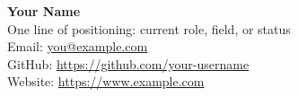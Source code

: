 \documentclass[letterpaper,10pt]{extarticle}
\newlength{\cvEntryGap}   \setlength{\cvEntryGap}{8pt}    %
\begin{document}
\pagestyle{fancy}
\renewcommand{\headrulewidth}{0pt}
\fancyhead{}
\fancyhead[R]{\textit{\monthyeardate\today}}
\thispagestyle{empty}

\begin{flushleft}
\textbf{\LARGE Your Name}\\[\cvEntryGap] %
One line of positioning: current role, field, or status
\\ Email: \url{you@example.com}
\\ GitHub: \url{https://github.com/your-username}
\\ Website: \url{https://www.example.com}


\end{flushleft}


\end{document}
